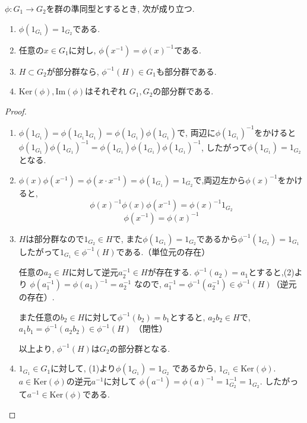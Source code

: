 \begin{tcolorbox}
	\begin{prp*}
		$\phi: G_1 \to G_2$を群の準同型とするとき, 次が成り立つ.
		\begin{enumerate}
			\item $\phi(1_{G_1})=1_{G_2}$である.
			\item 任意の$x\in G_1$に対し, $\phi(x^{-1})=\phi(x)^{-1}$である.
			\item $H \subset G_2$が部分群なら,
			$\phi^{-1}(H) \in G_1 $も部分群である.
			\item $ \mathrm{Ker}(\phi), \mathrm{Im}(\phi)$はそれぞれ
			$G_1, G_2$の部分群である.
		\end{enumerate}
	\end{prp*}
\end{tcolorbox}
\begin{proof}
	\begin{enumerate}
		\item $\phi(1_{G_1})=\phi(1_{G_1}1_{G_1})=\phi(1_{G_1})\phi(1_{G_1})$で,
		両辺に$\phi(1_{G_1})^{-1}$をかけると
		$\phi(1_{G_1})\phi(1_{G_1})^{-1}=\phi(1_{G_1})\phi(1_{G_1})\phi(1_{G_1})^{-1}$,
		したがって$\phi(1_{G_1})=1_{G_2}$となる.

		\item $  \phi(x)\phi(x^{-1}) = \phi(x\cdot x^{-1}) 
		= \phi(1_{G_1}) = 1_{G_2}$で,両辺左から$\phi(x)^{-1}$をかけると,
		\[ \phi(x)^{-1}\phi(x)\phi(x^{-1}) = \phi(x)^{-1} 1_{G_2} \]
		\[ \phi(x^{-1}) = \phi(x)^{-1} \]

		\item $H$は部分群なので$1_{G_2} \in H$で,
		また$\phi(1_{G_1})=1_{G_2}$であるから$\phi^{-1}(1_{G_2})=1_{G_1}$
		したがって$1_{G_1} \in \phi^{-1}(H)$である.（単位元の存在）

		任意の$ a_2 \in H$に対して逆元$a_2^{-1} \in H$が存在する.
		$\phi^{-1}(a_2)=a_1 $とすると,(2)より
		$\phi(a_1^{-1}) = \phi(a_1)^{-1} = a_2^{-1} $ なので,
		$a_1^{-1}=\phi^{-1}(a_2^{-1}) \in \phi^{-1}(H) $（逆元の存在）.
		
		また任意の$b_2 \in H$に対して$\phi^{-1}(b_2) = b_1$とすると,
		$ a_2 b_2 \in H $で, $ a_1 b_1 = \phi^{-1}(a_2 b_2) \in \phi^{-1}(H) $ （閉性）
		
		以上より, $ \phi^{-1}(H)$は$G_2$の部分群となる.

		\item $1_{G_1} \in G_1$に対して, (1)より$\phi(1_{G_1})=1_{G_2}$
		であるから, $ 1_{G_1} \in \mathrm{Ker}(\phi) $.
		$ a \in \mathrm{Ker}(\phi) $の逆元$a^{-1}$に対して
		$\phi(a^{-1})=\phi(a)^{-1}=1_{G_2}^{-1} = 1_{G_2}$.
		したがって$ a^{-1} \in \mathrm{Ker}(\phi) $である.


\end{enumerate}
\end{proof}
